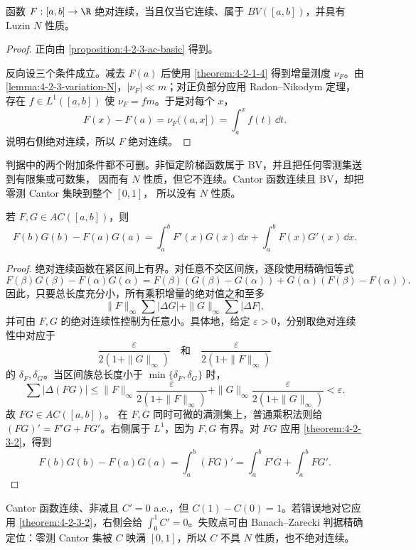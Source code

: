\begin{proposition}\label{proposition:4-2-3-5}
函数 $F:[a,b]\to\R$ 绝对连续，当且仅当它连续、属于 $BV([a,b])$，并具有 Luzin $N$ 性质。
\end{proposition}

\begin{proof}
正向由 \cref{proposition:4-2-3-ac-basic} 得到。

反向设三个条件成立。减去 $F(a)$ 后使用
\cref{theorem:4-2-1-4} 得到增量测度 $\nu_F$。由
\cref{lemma:4-2-3-variation-N}，$|\nu_F|\ll m$；对正负部分应用 Radon--Nikodym 定理，
存在 $f\in L^1([a,b])$ 使 $\nu_F=fm$。于是对每个 $x$，
\[
 F(x)-F(a)=\nu_F((a,x])=\int_a^xf(t)\,\dd t.
\]
 说明右侧绝对连续，所以 $F$ 绝对连续。
\end{proof}

判据中的两个附加条件都不可删。非恒定阶梯函数属于 BV，并且把任何零测集送到有限集或可数集，
因而有 $N$ 性质，但它不连续。Cantor 函数连续且 BV，却把零测 Cantor 集映到整个 $[0,1]$，
所以没有 $N$ 性质。

\begin{proposition}[积分部分公式]\label{proposition:4-2-3-4}
若 $F,G\in AC([a,b])$，则
\[
 F(b)G(b)-F(a)G(a)
 =\int_a^bF'(x)G(x)\,\dd x
  +\int_a^bF(x)G'(x)\,\dd x.
\]
\end{proposition}

\begin{proof}
绝对连续函数在紧区间上有界。对任意不交区间族，逐段使用精确恒等式
\[
 F(\beta)G(\beta)-F(\alpha)G(\alpha)
 =F(\beta)(G(\beta)-G(\alpha))
  +G(\alpha)(F(\beta)-F(\alpha)).
\]
因此，只要总长度充分小，所有乘积增量的绝对值之和至多
\[
 \|F\|_\infty\sum|\Delta G|
 +\|G\|_\infty\sum|\Delta F|,
\]
并可由 $F,G$ 的绝对连续性控制为任意小。具体地，给定 $\varepsilon>0$，分别取绝对连续性中对应于
\[
 \frac{\varepsilon}{2(1+\|G\|_\infty)}
 \quad\text{和}\quad
 \frac{\varepsilon}{2(1+\|F\|_\infty)}
\]
的 $\delta_F,\delta_G$。当区间族总长度小于
$\min\{\delta_F,\delta_G\}$ 时，
\[
 \sum|\Delta(FG)|
 \le \|F\|_\infty\frac{\varepsilon}{2(1+\|F\|_\infty)}
    +\|G\|_\infty\frac{\varepsilon}{2(1+\|G\|_\infty)}
 <\varepsilon.
\]
故 $FG\in AC([a,b])$。
在 $F,G$ 同时可微的满测集上，普通乘积法则给
$(FG)'=F'G+FG'$。右侧属于 $L^1$，因为 $F,G$ 有界。对 $FG$ 应用
\cref{theorem:4-2-3-2}，得到
\[
 F(b)G(b)-F(a)G(a)=\int_a^b(FG)'
 =\int_a^bF'G+\int_a^bFG'.
\]
\end{proof}

\begin{example}\label{ex:4-2-3-2}
Cantor 函数连续、非减且 $C'=0$ a.e.，但 $C(1)-C(0)=1$。若错误地对它应用
\cref{theorem:4-2-3-2}，右侧会给
$\int_0^1C'=0$。失败点可由 Banach--Zarecki 判据精确定位：零测 Cantor 集被 $C$ 映满
$[0,1]$，所以 $C$ 不具 $N$ 性质，也不绝对连续。
\end{example}

